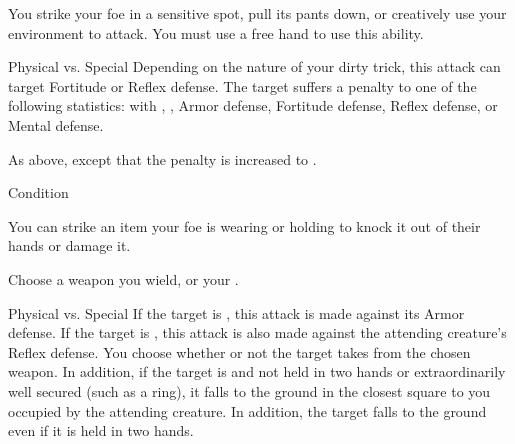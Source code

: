             \label{Dirty Trick} You strike your foe in a sensitive spot, pull its pants down, or creatively use your environment to attack.
            You must use a free hand to use this ability.
            \begin{ability}
                \begin{spelltargetinginfo}
                \end{spelltargetinginfo}
                \begin{spelleffects}
                    \begin{spellattack}{Physical vs. Special}
                        \spellspecial Depending on the nature of your dirty trick, this attack can target Fortitude or Reflex defense.
                        \spellsuccess The target suffers a  penalty to one of the following statistics:
                         with , , Armor defense, Fortitude defense, Reflex defense, or Mental defense.

                        \spellcritical As above, except that the penalty is increased to .
                    \end{spellattack}
                    \spelldur Condition
                \end{spelleffects}
            \end{ability}

            \label{Disarm} You can strike an item your foe is wearing or holding to knock it out of their hands or damage it.
            \begin{ability}
                \begin{spelltargetinginfo}
                    \spellspecial Choose a weapon you wield, or your .
                \end{spelltargetinginfo}
                \begin{spelleffects}
                    \begin{spellattack}{Physical vs. Special}
                        \spellspecial If the target is , this attack is made against its Armor defense.
                        If the target is , this attack is also made against the attending creature's Reflex defense.
                        \spellsuccess You choose whether or not the target takes  from the chosen weapon.
                        In addition, if the target is  and not held in two hands or extraordinarily well secured (such as a ring), it falls to the ground in the closest square to you occupied by the attending creature.
                        In addition, the target falls to the ground even if it is held in two hands.
                    \end{spellattack}
                \end{spelleffects}
            \end{ability}

